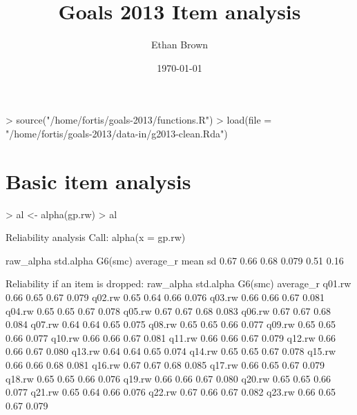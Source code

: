 \documentclass[11pt]{article}
\author{Ethan Brown}
\date{\today}
\title{Goals 2013 Item analysis}
\begin{document}
\maketitle
\begin{Schunk}
\begin{Sinput}
> source("/home/fortis/goals-2013/functions.R")
> load(file = "/home/fortis/goals-2013/data-in/g2013-clean.Rda")
\end{Sinput}
\end{Schunk}

\section{Basic item analysis}
\label{sec-1}

\begin{Schunk}
\begin{Sinput}
> al <- alpha(gp.rw)
> al
\end{Sinput}
\begin{Soutput}
Reliability analysis   
Call: alpha(x = gp.rw)

  raw_alpha std.alpha G6(smc) average_r mean   sd
      0.67      0.66    0.68     0.079 0.51 0.16

 Reliability if an item is dropped:
       raw_alpha std.alpha G6(smc) average_r
q01.rw      0.66      0.65    0.67     0.079
q02.rw      0.65      0.64    0.66     0.076
q03.rw      0.66      0.66    0.67     0.081
q04.rw      0.65      0.65    0.67     0.078
q05.rw      0.67      0.67    0.68     0.083
q06.rw      0.67      0.67    0.68     0.084
q07.rw      0.64      0.64    0.65     0.075
q08.rw      0.65      0.65    0.66     0.077
q09.rw      0.65      0.65    0.66     0.077
q10.rw      0.66      0.66    0.67     0.081
q11.rw      0.66      0.66    0.67     0.079
q12.rw      0.66      0.66    0.67     0.080
q13.rw      0.64      0.64    0.65     0.074
q14.rw      0.65      0.65    0.67     0.078
q15.rw      0.66      0.66    0.68     0.081
q16.rw      0.67      0.67    0.68     0.085
q17.rw      0.66      0.65    0.67     0.079
q18.rw      0.65      0.65    0.66     0.076
q19.rw      0.66      0.66    0.67     0.080
q20.rw      0.65      0.65    0.66     0.077
q21.rw      0.65      0.64    0.66     0.076
q22.rw      0.67      0.66    0.67     0.082
q23.rw      0.66      0.65    0.67     0.079


\end{Soutput}
\end{Schunk}
\end{document}
